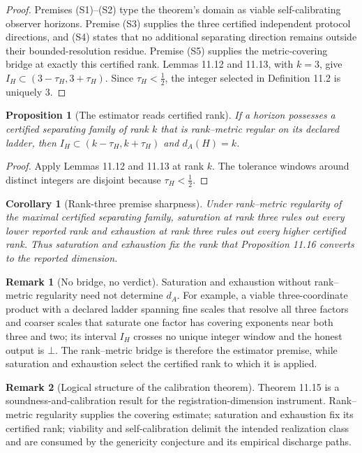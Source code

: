 \documentclass[11pt]{article}
\newtheorem{corollary}{Corollary}
\newtheorem{proposition}{Proposition}
\theoremstyle{definition}
\newtheorem{remark}{Remark}
\begin{document}
\begin{proof}
Premises (S1)--(S2) type the theorem's domain as viable self-calibrating observer horizons. Premise (S3) supplies the three certified independent protocol directions, and (S4) states that no additional separating direction remains outside their bounded-resolution residue. Premise (S5) supplies the metric-covering bridge at exactly this certified rank. Lemmas 11.12 and 11.13, with $k = 3$, give $I_H \subset (3 - \tau_H, 3 + \tau_H)$. Since $\tau_H < \tfrac{1}{2}$, the integer selected in Definition 11.2 is uniquely 3.
\end{proof}

\begin{proposition}[The estimator reads certified rank]
If a horizon possesses a certified separating family of rank $k$ that is rank--metric regular on its declared ladder, then $I_H \subset (k - \tau_H, k + \tau_H)$ and $d_A(H) = k$.
\end{proposition}

\begin{proof}
Apply Lemmas 11.12 and 11.13 at rank $k$. The tolerance windows around distinct integers are disjoint because $\tau_H < \tfrac{1}{2}$.
\end{proof}

\begin{corollary}[Rank-three premise sharpness]
Under rank--metric regularity of the maximal certified separating family, saturation at rank three rules out every lower reported rank and exhaustion at rank three rules out every higher certified rank. Thus saturation and exhaustion fix the rank that Proposition 11.16 converts to the reported dimension.
\end{corollary}

\begin{remark}[No bridge, no verdict]
Saturation and exhaustion without rank--metric regularity need not determine $d_A$. For example, a viable three-coordinate product with a declared ladder spanning fine scales that resolve all three factors and coarser scales that saturate one factor has covering exponents near both three and two; its interval $I_H$ crosses no unique integer window and the honest output is $\bot$. The rank--metric bridge is therefore the estimator premise, while saturation and exhaustion select the certified rank to which it is applied.
\end{remark}

\begin{remark}[Logical structure of the calibration theorem]
Theorem 11.15 is a soundness-and-calibration result for the registration-dimension instrument. Rank--metric regularity supplies the covering estimate; saturation and exhaustion fix its certified rank; viability and self-calibration delimit the intended realization class and are consumed by the genericity conjecture and its empirical discharge paths.
\end{remark}
\end{document}

